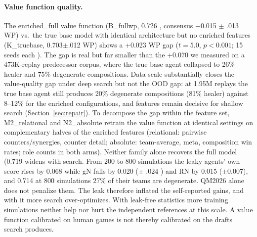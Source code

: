 \documentclass[journal]{IEEEtran}
\providecommand{\DIFaddtex}[1]{{\protect\color{blue} \sf #1}} %
\providecommand{\DIFdeltex}[1]{{\protect\color{red} \scriptsize #1}} %
\providecommand{\DIFaddbegin}{} %
\providecommand{\DIFaddend}{} %
\providecommand{\DIFdelbegin}{} %
\providecommand{\DIFdelend}{} %
\providecommand{\DIFadd}[1]{\texorpdfstring{\DIFaddtex{#1}}{#1}} %
\providecommand{\DIFdel}[1]{\texorpdfstring{\DIFdeltex{#1}}{}} %
\begin{document}
\paragraph{\DIFdel{Value function quality.}} %
\addtocounter{paragraph}{-1}%
\DIFdel{The enriched\_full value function (B\_fullwp, 0.726}\DIFdelend \DIFaddbegin \DIFadd{0.006, consensus $-$0.015 }\DIFaddend $\pm$ \DIFdelbegin \DIFdel{.013 WP) vs.\ the true base model with identical architecture but no enriched features (K\_truebase, 0.703$\pm$.012 WP) shows a +0.023 WP gap ($t = 5.0$, $p < 0.001$; 15 seeds each}\DIFdelend \DIFaddbegin \DIFadd{0.006}\DIFaddend ). The gap \DIFdelbegin \DIFdel{is real but far smaller than the +0.070 we measured on a 473K-replay predecessor corpus, where the true base agent collapsed to 26\% healer and 75\% degenerate compositions. Data scale substantially closes the value-quality gap under deep search but not the OOD gap: at 1.95M replays the true base agent still produces 20\% degenerate compositions (81\% healer) against 8--12\% for the enriched configurations, and features remain decisive for shallow search (Section~\ref{sec:repair}). To decompose the gap within the feature set, M2\_relational and N2\_absolute retrain the value function at identical settings on complementary halves of the enriched features (relational: pairwise counters/synergies, counter detail; absolute: team-average, meta, composition win rates; role counts in both arms). Neither family alone recovers the full model (0.719}\DIFdelend \DIFaddbegin \DIFadd{widens with search. From 200 to 800 simulations the leaky agents' own score rises by 0.068 while gN falls by 0.020 (}\DIFaddend $\pm$\DIFdelbegin \DIFdel{.024 }\DIFdelend \DIFaddbegin \DIFadd{0.006) and RN by 0.015 ($\pm$0.007), }\DIFaddend and \DIFdelbegin \DIFdel{0.714}\DIFdelend \DIFaddbegin \DIFadd{at 800 simulations 27\% of their teams are degenerate. QM2026 alone does not penalize them. The leak therefore inflated the self-reported gains, and with it more search over-optimizes. With leak-free statistics more training simulations neither help nor hurt the independent references at this scale. A value function calibrated on human games is not thereby calibrated on the drafts search produces.
}
\end{document}
